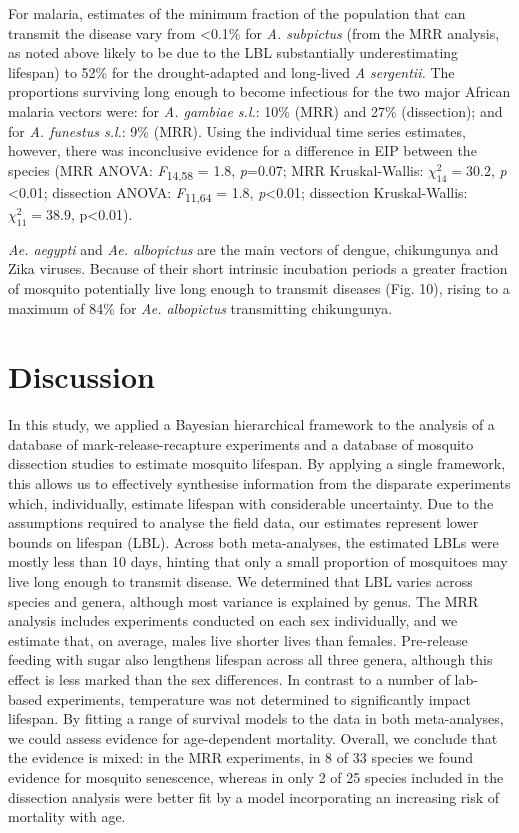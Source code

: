 \documentclass[]{article}
\begin{document}
For malaria, estimates of the minimum fraction of the population that
can transmit the disease vary from \textless{}0.1\% for \emph{A.
subpictus} (from the MRR analysis, as noted above likely to be due to
the LBL substantially underestimating lifespan) to 52\% for the
drought-adapted and long-lived \emph{A sergentii.} The proportions
surviving long enough to become infectious for the two major African
malaria vectors were: for \emph{A. gambiae s.l.}: 10\% (MRR) and 27\%
(dissection); and for \emph{A. funestus s.l.}: 9\% (MRR). Using the
individual time series estimates, however, there was inconclusive
evidence for a difference in EIP between the species (MRR ANOVA:
\emph{F}\textsubscript{14,58} = 1.8, \emph{p}=0.07; MRR Kruskal-Wallis:
\(\chi_{14}^{2} = 30.2\), \emph{p} \textless{}0.01; dissection ANOVA:
\emph{F}\textsubscript{11,64} = 1.8, \emph{p}\textless{}0.01; dissection
Kruskal-Wallis: \(\chi_{11}^{2} = 38.9\), p\textless{}0.01).

\emph{Ae. aegypti} and \emph{Ae. albopictus} are the main vectors of
dengue, chikungunya and Zika viruses. Because of their short intrinsic
incubation periods a greater fraction of mosquito potentially live long
enough to transmit diseases (Fig. 10), rising to a maximum of 84\% for
\emph{Ae. albopictus} transmitting chikungunya.

\section{Discussion}\label{discussion}

In this study, we applied a Bayesian hierarchical framework to the
analysis of a database of mark-release-recapture experiments and a
database of mosquito dissection studies to estimate mosquito lifespan.
By applying a single framework, this allows us to effectively synthesise
information from the disparate experiments which, individually, estimate
lifespan with considerable uncertainty. Due to the assumptions required
to analyse the field data, our estimates represent lower bounds on
lifespan (LBL). Across both meta-analyses, the estimated LBLs were
mostly less than 10 days, hinting that only a small proportion of
mosquitoes may live long enough to transmit disease. We determined that
LBL varies across species and genera, although most variance is
explained by genus. The MRR analysis includes experiments conducted on
each sex individually, and we estimate that, on average, males live
shorter lives than females. Pre-release feeding with sugar also
lengthens lifespan across all three genera, although this effect is less
marked than the sex differences. In contrast to a number of lab-based
experiments, temperature was not determined to significantly impact
lifespan. By fitting a range of survival models to the data in both
meta-analyses, we could assess evidence for age-dependent mortality.
Overall, we conclude that the evidence is mixed: in the MRR experiments,
in 8 of 33 species we found evidence for mosquito senescence, whereas in
only 2 of 25 species included in the dissection analysis were better fit
by a model incorporating an increasing risk of mortality with age.
\end{document}

